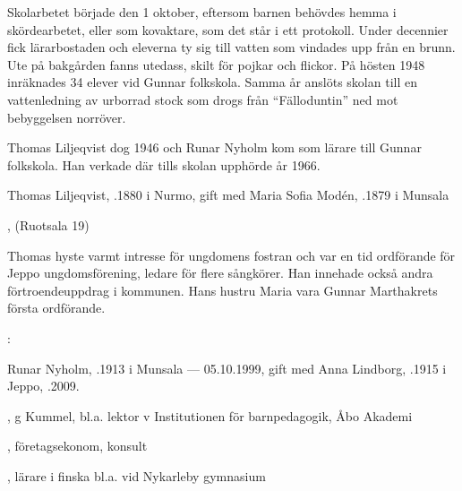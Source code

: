 Skolarbetet började den 1 oktober, eftersom barnen behövdes hemma i skördearbetet, eller som kovaktare, som det står i ett protokoll. Under decennier fick lärarbostaden och eleverna ty sig till vatten som vindades upp från en brunn. Ute på bakgården fanns utedass, skilt för pojkar och flickor. På hösten 1948 inräknades 34 elever vid Gunnar folkskola. Samma år anslöts skolan till en vattenledning av urborrad stock som drogs från ``Fälloduntin'' ned mot bebyggelsen norröver.

Thomas Liljeqvist dog 1946 och Runar Nyholm kom som lärare till Gunnar folkskola. Han verkade där tills skolan upphörde år 1966.



Thomas Liljeqvist, .1880 i Nurmo, gift med Maria Sofia Modén,  .1879 i Munsala

\begin{jhchildren}
  \item {}
  \item {}
  \item {}
  \item {}
  \item {}, (Ruotsala 19)
\end{jhchildren}

Thomas hyste varmt intresse för ungdomens fostran och var en tid ordförande för Jeppo ungdomsförening, ledare för flere sångkörer. Han innehade också andra förtroendeuppdrag i kommunen. Hans hustru Maria vara Gunnar Marthakrets första ordförande.

:

Runar Nyholm, .1913 i Munsala --- 05.10.1999, gift med Anna Lindborg, .1915 i Jeppo, .2009.
\begin{jhchildren}
  \item {}, g Kummel, bl.a. lektor v Institutionen för barnpedagogik, Åbo Akademi
  \item {}, företagsekonom, konsult
  \item {}, lärare i finska bl.a. vid Nykarleby gymnasium
\end{jhchildren}

